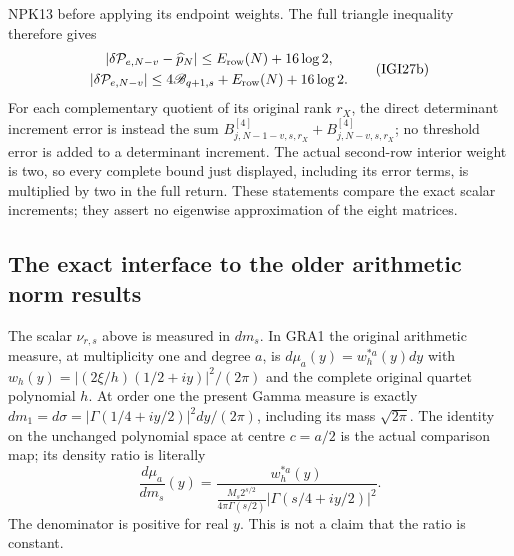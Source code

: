 \documentclass[11pt,a4paper]{article}
\begin{document}
NPK13 before applying its endpoint weights. The full triangle
inequality therefore gives
\[
\begin{gathered}
 |\delta\mathcal P_{e,N-v}-\widehat p_N|
       \le E_{\rm row}(N)+16\log2,\\
 |\delta\mathcal P_{e,N-v}|
       \le4\mathscr B_{q+1,s}+E_{\rm row}(N)+16\log2.
\end{gathered}                                                    \tag{IGI27b}
\]
For each complementary quotient of its original rank $r_X$, the
direct determinant increment error is instead the sum
$B^{[4]}_{j,N-1-v,s,r_X}+B^{[4]}_{j,N-v,s,r_X}$; no threshold
error is added to a determinant increment. The actual second-row
interior weight is two, so every complete bound just displayed,
including its error terms, is multiplied by two in the full
return. These statements compare the exact scalar increments;
they assert no eigenwise approximation of the eight matrices.

\subsection{The exact interface to the older arithmetic norm results}
The scalar $\nu_{r,s}$ above is measured in $dm_s$. In GRA1 the
original arithmetic measure, at multiplicity one and degree $a$,
is $d\mu_a(y)=w_h^{*a}(y)dy$ with
$w_h(y)=|(2\xi/h)(1/2+iy)|^2/(2\pi)$ and the complete original
quartet polynomial $h$. At order one the present Gamma measure is
exactly $dm_1=d\sigma=|\Gamma(1/4+iy/2)|^2dy/(2\pi)$,
including its mass $\sqrt{2\pi}$. The identity on the unchanged
polynomial space at centre $c=a/2$ is the actual comparison map;
its density ratio is literally
\[
 \frac{d\mu_a}{dm_s}(y)=
 \frac{w_h^{*a}(y)}{
  \displaystyle\frac{M_s2^{s/2}}{4\pi\Gamma(s/2)}
                   |\Gamma(s/4+iy/2)|^2}.                \tag{IGI28}
\]
The denominator is positive for real $y$. This is not a claim
that the ratio is constant.
\end{document}
